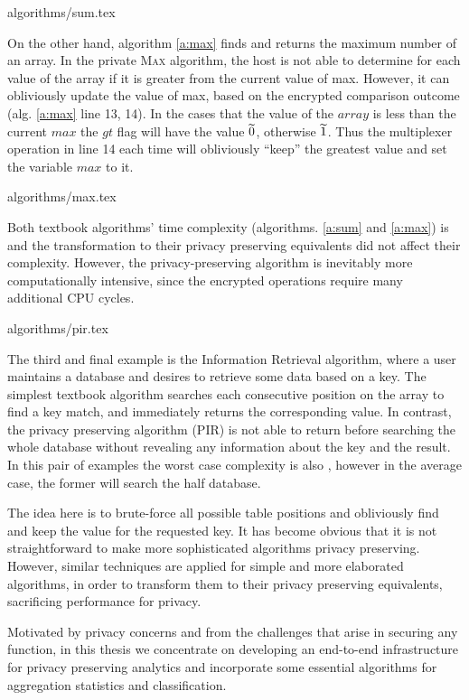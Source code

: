 {algorithms/sum.tex}


On the other hand, algorithm \ref{a:max} finds and returns the maximum number of an array.
In the private {\textsc{Max}} algorithm, the host is not able to determine for each value of the array if it is greater from the current value of max.
However, it can obliviously update the value of max, based on the encrypted comparison outcome (alg. \ref{a:max} line 13, 14).
In the cases that the value of the $array$ is less than the current $max$ the $gt$ flag will have the value $\widetilde{0}$, otherwise $\widetilde{1}$.
Thus the multiplexer operation in line 14 each time will obliviously ``keep'' the greatest value and set the variable $max$ to it.

{algorithms/max.tex}

Both textbook algorithms' time complexity (algorithms. \ref{a:sum} and \ref{a:max}) is  and the transformation to their privacy preserving equivalents did not affect their complexity.
However, the privacy\hyp preserving algorithm is inevitably more computationally intensive, since the encrypted operations require many additional CPU cycles.


{algorithms/pir.tex}

The third and final example is the Information Retrieval algorithm, where a user maintains a database and desires to retrieve some data based on a key.
The simplest textbook algorithm searches each consecutive position on the array to find a key match, and immediately returns the corresponding value.
In contrast, the privacy preserving algorithm (PIR) \cite{chor1995private} is not able to return before searching the whole database without revealing any information about the key and the result.
In this pair of examples the worst case complexity is also , however in the average case, the former will search the half database.

The idea here is to brute\hyp force all possible table positions and obliviously find and keep the value for the requested key.
It has become obvious that it is not straightforward to make more sophisticated algorithms privacy preserving.
However, similar techniques are applied for simple and more elaborated algorithms, in order to transform them to their privacy preserving equivalents, sacrificing performance for privacy.

Motivated by privacy concerns and from the challenges that arise in securing any function, in this thesis we concentrate on developing an end-to-end infrastructure for privacy preserving analytics and incorporate some essential algorithms for aggregation statistics and classification.




